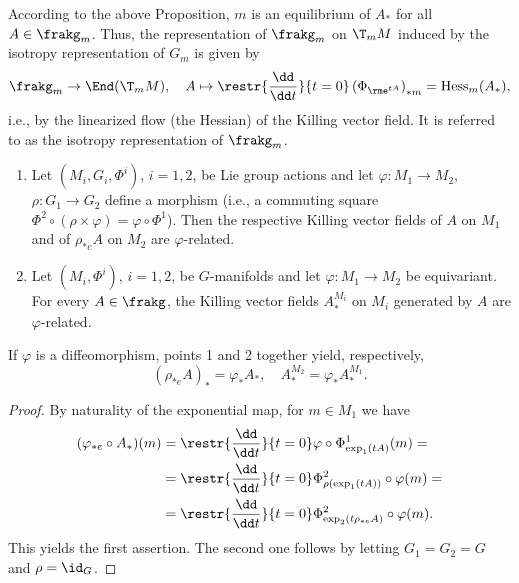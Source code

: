 \begin{rem}
    According to the above Proposition, $m$ is an equilibrium of $A_\ast$ for all $A\in\frakg_m$. Thus, the representation of $\frakg_m$ on $\T_mM$ induced by the isotropy representation of $G_m$ is given by
    \[\frakg_m\to \End(\T_mM),\quad A\mapsto \restr{\frac{\dd}{\dd t}}{t=0} \left(\Phi_{\rme^{tA}}\right)_{\ast m}=\mathrm{Hess}_m(A_\ast),\]
    i.e., by the linearized flow (the Hessian) of the Killing vector field. It is referred to as the isotropy representation of $\frakg_m$.
\end{rem}

\begin{prop}\label{prop 6.2.4 RS1}
    \begin{enumerate}
        \item Let $(M_i,G_i,\Phi^i)$, $i=1,2$, be Lie group actions and let $\varphi:M_1\to M_2$, $\rho:G_1\to G_2$ define a morphism (i.e., a commuting square $\Phi^2\circ(\rho\times\varphi)=\varphi\circ\Phi^1$). Then the respective Killing vector fields of $A$ on $M_1$ and of $\rho_{\ast e} A$ on $M_2$ are $\varphi$-related.
        \item Let $(M_i,\Phi^i)$, $i=1,2$, be $G$-manifolds and let $\varphi:M_1\to M_2$ be equivariant. For every $A\in\frakg$, the Killing vector fields $A_\ast^{M_i}$ on $M_i$ generated by $A$ are $\varphi$-related.
    \end{enumerate}
    If $\varphi$ is a diffeomorphism, points 1 and 2 together yield, respectively,
    \[\left(\rho_{\ast e}A\right)_\ast=\varphi_{\ast}A_\ast,\quad A_\ast^{M_2}=\varphi_\ast A_\ast^{M_1}.\]
\end{prop}
\begin{proof}
    By naturality of the exponential map, for $m\in M_1$ we have
    \begin{align}
        (\varphi_{\ast e}\circ A_\ast)(m)&=\restr{\frac{\dd}{\dd t}}{t=0} \varphi\circ \Phi^1_{\exp_1(tA)}(m)=\notag\\
        &=\restr{\frac{\dd}{\dd t}}{t=0} \Phi^2_{\rho(\exp_1(tA))}\circ\varphi(m)=\notag\\
        &=\restr{\frac{\dd}{\dd t}}{t=0}\Phi^2_{\exp_2(t\rho_{\ast e}A)}\circ\varphi(m).
    \end{align}
    This yields the first assertion. The second one follows by letting $G_1=G_2=G$ and $\rho=\id_G$.
\end{proof}

